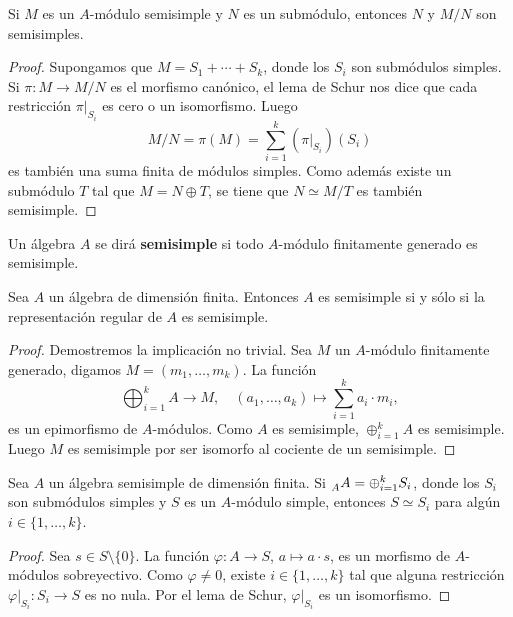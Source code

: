 \begin{proposition}
Si $M$ es un $A$-módulo semisimple y $N$ es un submódulo, entonces $N$ y $M/N$ son semisimples.	
\end{proposition}

\begin{proof}
	Supongamos que $M=S_1+\cdots+ S_k$, donde los $S_i$ son submódulos simples. Si $\pi\colon M\to M/N$ es el morfismo canónico, el lema de Schur nos dice que  
	cada restricción $\pi|_{S_i}$ es cero o un isomorfismo. Luego
	\[
	M/N=\pi(M)=\sum_{i=1}^k(\pi|_{S_i})(S_i)
	\]
	es también una suma finita de módulos simples. Como además existe un submódulo $T$ tal que 
	$M=N\oplus T$, se tiene que $N\simeq M/T$ es también semisimple.    
\end{proof}

\begin{definition}
Un álgebra $A$ se dirá \textbf{semisimple} si todo $A$-módulo finitamente generado es semisimple. 
\end{definition}

\begin{proposition}
Sea $A$ un álgebra de dimensión finita. Entonces $A$ es semisimple si y sólo si la representación
regular de $A$ es semisimple.
\end{proposition}

\begin{proof}
Demostremos la implicación no trivial. Sea $M$ un $A$-módulo finitamente generado, digamos $M=(m_1,\dots,m_k)$. 
La función 
\[
\bigoplus_{i=1}^k A\to M,\quad
(a_1,\dots,a_k)\mapsto \sum_{i=1}^k a_i\cdot m_i,
\]
es un epimorfismo de $A$-módulos. Como
$A$ es semisimple, $\oplus_{i=1}^kA$ es semisimple. 
Luego $M$ es semisimple por ser isomorfo al cociente de un semisimple. 
\end{proof}

\begin{theorem}
Sea $A$ un álgebra semisimple de dimensión finita. Si $\prescript{}{A}A=\oplus_{i=1}^k S_i$, donde los $S_i$ son submódulos simples y 
$S$ es un $A$-módulo simple, entonces $S\simeq S_i$ para algún $i\in\{1,\dots,k\}$. 
\end{theorem}

\begin{proof}
Sea $s\in S\setminus\{0\}$. La función $\varphi\colon A\to S$, $a\mapsto a\cdot s$, es un morfismo de $A$-módulos  
sobreyectivo. Como $\varphi\ne 0$, existe $i\in\{1,\dots,k\}$ tal que alguna restricción 
$\varphi|_{S_i}\colon S_i\to S$ es no nula. 
Por el lema de Schur, $\varphi|_{S_i}$ es un isomorfismo.  	
\end{proof}

